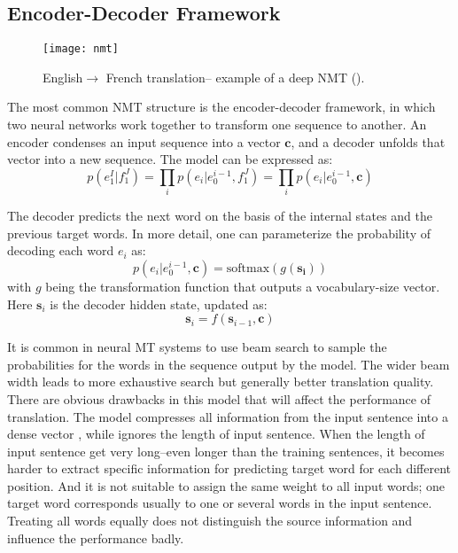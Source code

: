 \subsection{Encoder-Decoder Framework}
\begin{figure}[t]
	\texttt{[image: nmt]}
	\caption{ English$\rightarrow$ French translation– example of a deep NMT (\cite{luong2015effective}).}
	\centering
\end{figure}

The most common NMT structure is the encoder-decoder framework, in which two  neural networks work together to transform one sequence to another. An encoder condenses an input sequence into a vector $\bm{c}$, and a decoder unfolds that vector into a new sequence. The model can be expressed as:
\[ p(e_1^I | f_1^J) = \prod_{i} p(e_i|e_0^{i-1}, f_1^J) = \prod_{i} {p(e_i|e_0^{i-1},  {\bm{c}})} \] 

 The decoder predicts the next word on the basis of the internal states and the previous target words. In more detail, one can parameterize the probability of decoding each word $e_i$ as:
 \[ p(e_i|e_0^{i-1},  {\bm{c}}) = \text{softmax}(g(\bm{s_i}))\]
 with $g$ being the transformation function that outputs a vocabulary-size vector. Here $\bm{s}_i$ is the decoder hidden state, updated as:
\[ \bm{s}_i = f(\bm{s}_{i-1}, \bm{c})\]

It is common in neural MT systems to use beam search to sample the probabilities for the words in the sequence output by the model. The wider beam width leads to more exhaustive search but generally better translation quality.\\

%
%

There are obvious drawbacks in this model that will affect the performance of translation. The model compresses all information from the input sentence into a dense vector , while ignores the length of input sentence. When the length of input sentence get very long--even longer than the training sentences, it becomes harder to extract specific information for predicting  target word for each different position. And it is not suitable to assign the same weight to all input words; one target word corresponds usually to one or several words in the input sentence. Treating all words equally does not distinguish the source information and influence the performance badly.


